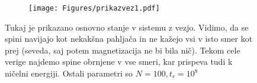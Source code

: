 \documentclass{article}
\begin{document}
\begin{figure}[H]
\centering
\begin{subfigure}{.8\textwidth}
\texttt{[image: Figures/prikazvez1.pdf]}
\end{subfigure}
\caption*{Tukaj je prikazano osnovno stanje v sistemu z vezjo. Vidimo, da se spini navijajo kot nekakšna pahljača in ne kažejo vsi v isto smer kot prej (seveda, saj potem magnetizacija ne bi bila nič). Tekom cele verige najdemo spine obrnjene v vse smeri, kar prispeva tudi k ničelni energiji. Ostali parametri so $N=100,t_r = 10^8$}
\end{figure}
\end{document}

